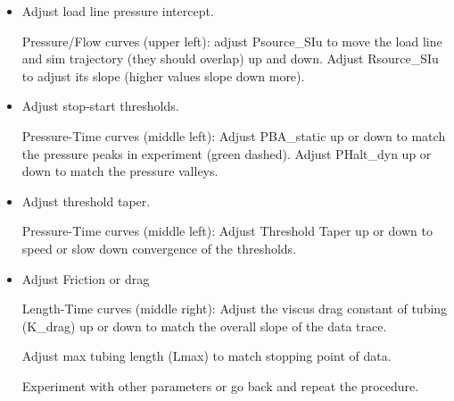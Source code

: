 
\begin{itemize}
    \item  Adjust load line pressure intercept.

    Pressure/Flow curves (upper left):
    adjust Psource_SIu to move the load line and sim trajectory (they should overlap)
    up and down.  Adjust Rsource_SIu to adjust its slope (higher values slope down more).

    \item Adjust stop-start thresholds.

    Pressure-Time curves (middle left):
    Adjust PBA_static up or down to match the pressure peaks in experiment (green dashed).
    Adjust PHalt_dyn  up or down to match the pressure valleys.

    \item Adjust threshold taper.

    Pressure-Time curves (middle left):
    Adjust Threshold Taper up or down to speed or slow down convergence of the thresholds.

    \item Adjust Friction or drag

    Length-Time curves (middle right):
    Adjust the viscus drag constant of tubing (K_drag) up or down to match the overall slope
    of the data trace.

    Adjust max tubing length (Lmax) to match stopping point of data.

    \tiem Experiment with other parameters or go back and repeat the procedure.

\end{itemize}
